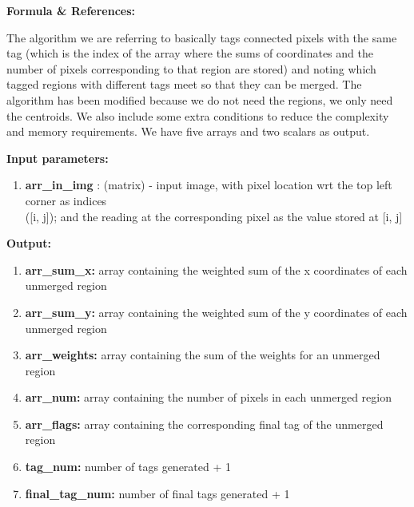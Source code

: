 \documentclass[a4paper, oneside,11pt]{article}
\begin{document}
\textbf{Formula \& References:}

The algorithm we are referring to basically tags connected pixels with the same tag (which is the index of the array where the sums of coordinates  and the number of pixels corresponding to that region are stored) and noting which tagged regions with different tags meet so that they can be merged\cite{image_seg}. The algorithm has been modified because we do not need the regions, we only need the centroids. We also include some extra conditions to reduce the complexity and memory requirements. We have five arrays and two scalars as output.

\textbf{Input parameters:}
\begin{enumerate}
    \item \textbf{arr\_in\_img} : (matrix) - input image, with pixel location wrt the top left corner as indices\\([i, j]); and the reading at the corresponding pixel as the value stored at [i, j]
\end{enumerate} 


\textbf{Output:}
\begin{enumerate}
    \item \textbf{arr\_sum\_x:} array containing the weighted sum of the x coordinates of each unmerged region
    \item \textbf{arr\_sum\_y:} array containing the weighted sum of the y coordinates of each unmerged region
    \item \textbf{arr\_weights:} array containing the sum of the weights for an unmerged region
    \item \textbf{arr\_num:} array containing the number of pixels in each unmerged region
    \item \textbf{arr\_flags:} array containing the corresponding final tag of the unmerged region
    \item \textbf{tag\_num:} number of tags generated + 1
    \item \textbf{final\_tag\_num:} number of final tags generated + 1
\end{enumerate}




\end{document}
